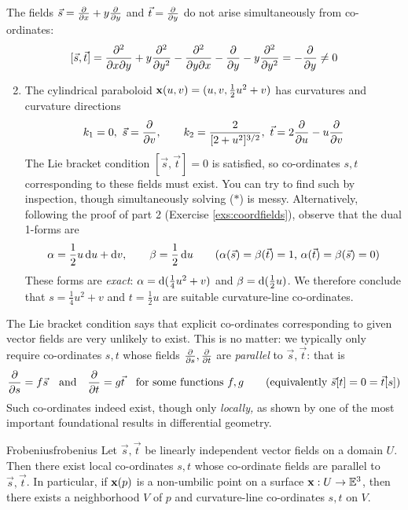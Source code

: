 \begin{examples}{}{}
	\exstart The fields $\vec s=\partials x+y\partials y$ and $\vec t=\partials y$ do not arise simultaneously from co-ordinates:
	\[
		[\vec s,\vec t]=\partials[^2]{x\partial y}+y\partials[^2]{y^2} -\partials[^2]{y\partial x}-\partials y-y\partials[^2]{y^2} =-\partials y\neq 0
	\]
	\begin{enumerate}\setcounter{enumi}{1}
	  \item The cylindrical paraboloid $\vx(u,v)=(u,v,\frac 12u^2+v)$ has curvatures and curvature directions
	  \[
	  	k_1=0, \ \vec s=\partials v,\qquad k_2=\frac 2{[2+u^2]^{3/2}},\  \vec t=2\partials u-u\partials v
	  \]
	  The Lie bracket condition $[\vec s,\vec t]=0$ is satisfied, so co-ordinates $s,t$ corresponding to these fields must exist. You can try to find such by inspection, though simultaneously solving ($\ast$) is messy. Alternatively, following the proof of part 2 (Exercise \ref{exs:coordfields}), observe that the dual 1-forms are
	  \[
	  	\alpha=\frac 12u\,\du+\dv, \qquad \beta=\frac 12\,\du  \tag{$\alpha(\vec s)=\beta(\vec t)=1$, $\alpha(\vec t)=\beta(\vec s)=0$}
	  \]
	  These forms are \emph{exact}: $\alpha=\D(\frac 14u^2+v)$ and $\beta=\D(\frac 12u)$. We therefore conclude that $s=\frac 14u^2+v$ and $t=\frac 12u$ are suitable curvature-line co-ordinates.
	\end{enumerate}
\end{examples}

The Lie bracket condition says that explicit co-ordinates corresponding to given vector fields are very unlikely to exist. This is no matter: we typically only require co-ordinates $s,t$ whose fields $\partials s,\partials t$ are \emph{parallel} to $\vec s,\vec t$: that is
\[
	\partials s=f\vec s \quad\text{and}\quad \partials t=g\vec t \quad \text{for some functions $f,g$} \tag{equivalently $\vec s[t]=0=\vec t[s]$}
\]
Such co-ordinates indeed exist, though only \emph{locally,} as shown by one of the most important foundational results in differential geometry.

\begin{thm}{Frobenius}{frobenius}
	Let $\vec s,\vec t$ be linearly independent vector fields on a domain $U$. Then there exist local co-ordinates $s,t$ whose co-ordinate fields are parallel to $\vec s,\vec t$.\smallbreak
	In particular, if $\vx(p)$ is a non-umbilic point on a surface $\vx:U\to\E^3$, then there exists a neighborhood $V$ of $p$ and curvature-line co-ordinates $s,t$ on $V$.
\end{thm}

